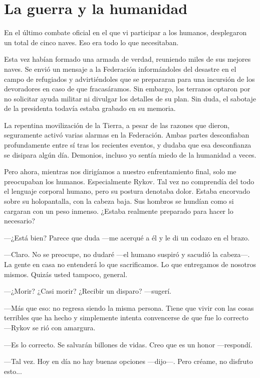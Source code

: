 \chapter{La guerra y la humanidad}\label{sec:la-guerra-y-la-humanidad}

En el último combate oficial en el que vi participar a los humanos, desplegaron un total de cinco naves. Eso era todo lo que necesitaban.

Esta vez habían formado una armada de verdad, reuniendo miles de sus mejores naves. Se envió un mensaje a la Federación informándoles del desastre en el campo de refugiados y advirtiéndoles que se prepararan para una incursión de los devoradores en caso de que fracasáramos. Sin embargo, los terranos optaron por no solicitar ayuda militar ni divulgar los detalles de su plan. Sin duda, el sabotaje de la presidenta todavía estaba grabado en su memoria.

La repentina movilización de la Tierra, a pesar de las razones que dieron, seguramente activó varias alarmas en la Federación. Ambas partes desconfiaban profundamente entre sí tras los recientes eventos, y dudaba que esa desconfianza se disipara algún día. Demonios, incluso yo sentía miedo de la humanidad a veces.

Pero ahora, mientras nos dirigíamos a nuestro enfrentamiento final, solo me preocupaban los humanos. Especialmente Rykov. Tal vez no comprendía del todo el lenguaje corporal humano, pero su postura denotaba dolor. Estaba encorvado sobre su holopantalla, con la cabeza baja. Sus hombros se hundían como si cargaran con un peso inmenso. ¿Estaba realmente preparado para hacer lo necesario?

 —¿Está bien? Parece que duda —me acerqué a él y le di un codazo en el brazo.

—Claro. No se preocupe, no dudaré —el humano suspiró y sacudió la cabeza—. La gente en casa no entenderá lo que sacrificamos. Lo que entregamos de nosotros mismos. Quizás usted tampoco, general.

 —¿Morir? ¿Casi morir? ¿Recibir un disparo? —sugerí.

—Más que eso: no regresa siendo la misma persona. Tiene que vivir con las cosas terribles que ha hecho y simplemente intenta convencerse de que fue lo correcto —Rykov se rió con amargura.

—Es lo correcto. Se salvarán billones de vidas. Creo que es un honor —respondí.

—Tal vez. Hoy en día no hay buenas opciones —dijo—. Pero créame, no disfruto esto...

